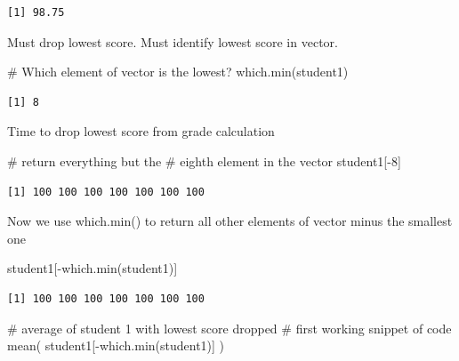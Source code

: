 \documentclass[
  letterpaper,
  DIV=11,
  numbers=noendperiod]{scrartcl}
\newenvironment{Shaded}{\begin{snugshade}}{\end{snugshade}}
\newcommand{\CommentTok}[1]{\textcolor[rgb]{0.37,0.37,0.37}{#1}}
\newcommand{\DecValTok}[1]{\textcolor[rgb]{0.68,0.00,0.00}{#1}}
\newcommand{\FunctionTok}[1]{\textcolor[rgb]{0.28,0.35,0.67}{#1}}
\newcommand{\NormalTok}[1]{\textcolor[rgb]{0.00,0.23,0.31}{#1}}
\newcommand{\SpecialCharTok}[1]{\textcolor[rgb]{0.37,0.37,0.37}{#1}}
\begin{document}
\begin{verbatim}
[1] 98.75
\end{verbatim}

Must drop lowest score. Must identify lowest score in vector.

\begin{Shaded}
\begin{Highlighting}[]
\CommentTok{\# Which element of vector is the lowest?}
\FunctionTok{which.min}\NormalTok{(student1)}
\end{Highlighting}
\end{Shaded}

\begin{verbatim}
[1] 8
\end{verbatim}

Time to drop lowest score from grade calculation

\begin{Shaded}
\begin{Highlighting}[]
\CommentTok{\# return everything but the }
\CommentTok{\# eighth element in the vector}
\NormalTok{student1[}\SpecialCharTok{{-}}\DecValTok{8}\NormalTok{]}
\end{Highlighting}
\end{Shaded}

\begin{verbatim}
[1] 100 100 100 100 100 100 100
\end{verbatim}

Now we use which.min() to return all other elements of vector minus the
smallest one

\begin{Shaded}
\begin{Highlighting}[]
\NormalTok{student1[}\SpecialCharTok{{-}}\FunctionTok{which.min}\NormalTok{(student1)]}
\end{Highlighting}
\end{Shaded}

\begin{verbatim}
[1] 100 100 100 100 100 100 100
\end{verbatim}

\begin{Shaded}
\begin{Highlighting}[]
\CommentTok{\# average of student 1 with lowest score dropped }
\CommentTok{\# first working snippet of code}
\FunctionTok{mean}\NormalTok{( student1[}\SpecialCharTok{{-}}\FunctionTok{which.min}\NormalTok{(student1)] )}
\end{Highlighting}
\end{Shaded}
\end{document}
